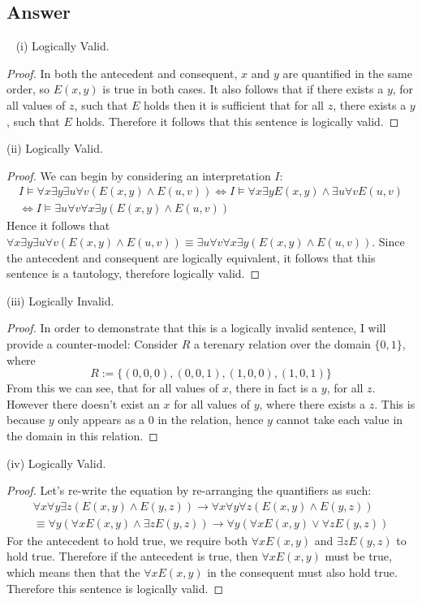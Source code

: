 \documentclass[12pt]{fphw}
\begin{document}
\subsection*{Answer} \ \newline
(i) Logically Valid.
\begin{proof}
    In both the antecedent and consequent, $x$ and $y$ are quantified in the same order, so $E(x,y)$ is true in both cases. It also follows that if there exists a $y$, for all values of $z$, such that $E$ holds then it is sufficient that for all $z$, there exists a $y$, such that $E$ holds.
    Therefore it follows that this sentence is logically valid.
\end{proof}  \noindent
(ii) Logically Valid.
\begin{proof}
    We can begin by considering an interpretation $I$:
    \begin{gather*}
        I \models \forall x \exists y \exists u \forall v (E(x,y) \wedge E(u,v)) \iff I \models \forall x \exists y E(x,y) \wedge \exists u \forall v E(u, v) \\ 
        \iff I \models \exists u \forall v \forall x \exists y (E(x,y) \wedge E(u,v))
    \end{gather*}
    Hence it follows that $\forall x \exists y \exists u \forall v (E(x,y) \wedge E(u,v)) \equiv \exists u \forall v \forall x \exists y(E(x,y) \wedge E(u,v))$. Since the antecedent and consequent are logically equivalent, it follows that this sentence is a tautology, therefore logically valid.
\end{proof} \noindent
(iii) Logically Invalid.
\begin{proof}
In order to demonstrate that this is a logically invalid sentence, I will provide a counter-model: Consider $R$ a terenary relation over the domain $\{0, 1\}$, where
$$
R := \{(0,0,0),(0,0,1),(1,0,0),(1,0,1)\}
$$
From this we can see, that for all values of $x$, there in fact is a $y$, for all $z$. However there doesn't exist an $x$ for all values of $y$, where there exists a $z$. This is because $y$ only appears as a $0$ in the relation, hence $y$ cannot take each value in the domain in this relation.
\end{proof} \noindent
(iv) Logically Valid.
\begin{proof}
    Let's re-write the equation by re-arranging the quantifiers as such:
    \begin{gather*}
        \forall x \forall y \exists z (E(x,y) \wedge E(y,z)) \to \forall x \forall y \forall z (E(x,y) \wedge E(y,z)) \\ 
        \equiv \forall y (\forall x E(x,y) \wedge \exists z E(y,z)) \to \forall y (\forall x E(x,y) \vee \forall z E(y,z))
    \end{gather*}
    For the antecedent to hold true, we require both $\forall x E(x,y)$ and $\exists z E(y,z)$ to hold true. Therefore if the antecedent is true, then $\forall x E(x,y)$ must be true, which means then that the $\forall x E(x,y)$ in the consequent must also hold true. Therefore this sentence is logically valid.
\end{proof} \noindent
\end{document}
